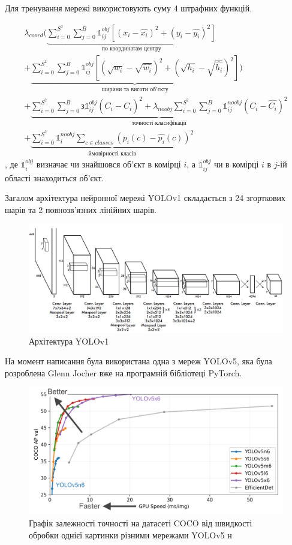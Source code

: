 Для тренування мережі використовують суму 4 штрафних функцій.

\begin{multline}
    \lambda_{coord}(
    \underbrace{ \sum_{i=0}^{S^2} \sum_{j=0}^{B}
    \mathbb{1}_{ij}^{obj} [(x_i - \widehat{x_i})^2 + (y_i - \widehat{y_i})^2]
    }_\textrm{по координатам центру}\\
    +
    \underbrace{
    \sum_{i=0}^{S^2} \sum_{j=0}^{B}
    \mathbb{1}_{ij}^{obj} [(\sqrt{w_i} - \sqrt{\widehat{w_i}})^2 + (\sqrt{h_i} - \sqrt{\widehat{h_i}})^2]
    }_\textrm{ширини та висоти об'єкту}
    )\\
    +  \underbrace{
        \sum_{i=0}^{S^2} \sum_{j=0}^{B} з
        \mathbb{1}_{ij}^{obj} (C_i - \widehat{C_i})^2
        +
        \lambda_{noobj} \sum_{i=0}^{S^2} \sum_{j=0}^{B} \mathbb{1}_{ij}^{noobj} (C_i - \widehat{C_i})^2
    }_\textrm{точності класифікації}\\
    +  \underbrace{
    \sum_{i=0}^{S^2} \mathbb{1}_{i}^{noobj}\sum_{c \in classes}(p_i(c) -  \widehat{p_i}(c))^2
    }_\textrm{ймовірності класів}
    \label{eq:cnn:yolo_loss}
\end{multline}
, де $\mathbb{1}_{i}^{obj}$ визначає чи знайшовся об'єкт в комірці $i$, а
$\mathbb{1}_{ij}^{obj}$ чи в комірці $i$ в $j$-ій області знаходиться об'єкт.

Загалом архітектура нейронної мережі YOLOv1 складається з 24 згорткових шарів та
2 повнозв'язних лінійних шарів.

\begin{figure}[H]
    \includegraphics[width=0.8\linewidth]{images/cnn_yolo2}
    \centering
    \caption{Архітектура YOLOv1 \cite{RedmonYolo}
    }
\end{figure}

На момент написання була використана одна з мереж YOLOv5, яка була
розроблена Glenn Jocher вже на програмній бібліотеці PyTorch.

\begin{figure}[H]
    \includegraphics[width=0.5\linewidth]{images/cnn_yolo3}
    \centering
    \caption{Графік залежності точності на датасеті COCO від швидкості обробки однієї
        картинки різними мережами YOLOv5 н
    }
\end{figure}

